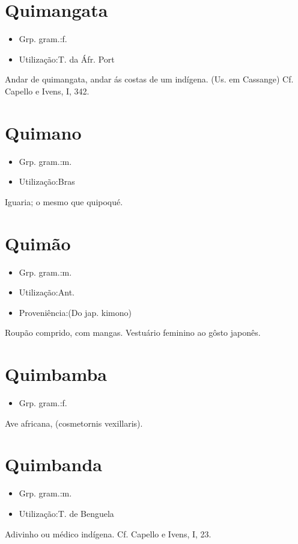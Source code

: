 \section{Quimangata}
\begin{itemize}
\item {Grp. gram.:f.}
\end{itemize}
\begin{itemize}
\item {Utilização:T. da Áfr. Port}
\end{itemize}
\textunderscore Andar de quimangata\textunderscore , andar ás costas de um indígena. (Us. em Cassange) Cf. Capello e Ivens, I, 342.
\section{Quimano}
\begin{itemize}
\item {Grp. gram.:m.}
\end{itemize}
\begin{itemize}
\item {Utilização:Bras}
\end{itemize}
Iguaria; o mesmo que \textunderscore quipoqué\textunderscore .
\section{Quimão}
\begin{itemize}
\item {Grp. gram.:m.}
\end{itemize}
\begin{itemize}
\item {Utilização:Ant.}
\end{itemize}
\begin{itemize}
\item {Proveniência:(Do jap. \textunderscore kimono\textunderscore )}
\end{itemize}
Roupão comprido, com mangas.
Vestuário feminino ao gôsto japonês.
\section{Quimbamba}
\begin{itemize}
\item {Grp. gram.:f.}
\end{itemize}
Ave africana, (\textunderscore cosmetornis vexillaris\textunderscore ).
\section{Quimbanda}
\begin{itemize}
\item {Grp. gram.:m.}
\end{itemize}
\begin{itemize}
\item {Utilização:T. de Benguela}
\end{itemize}
Adivinho ou médico indígena. Cf. Capello e Ivens, I, 23.
